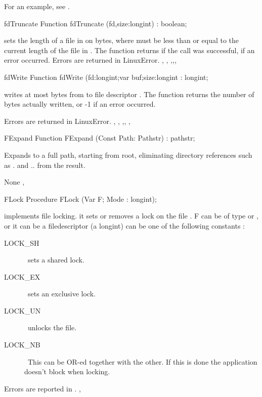 For an example, see .
\begin{function}{fdTruncate}
\Declaration
Function fdTruncate (fd,size:longint) : boolean;

\Description
{} sets the length of a file in  on 
bytes, where  must be less than or equal to the current length of
the file in .
The function returns  if the call was successful,  if
an error occurred.
\Errors
Errors are returned in LinuxError.
\SeeAlso
{}, , ,,,
\end{function}
\begin{function}{fdWrite}
\Declaration
Function fdWrite (fd:longint;var buf;size:longint : longint;

\Description
{} writes at most  bytes from  to
file descriptor .
The function returns the number of bytes actually written, or -1 if an error
occurred.

\Errors
Errors are returned in LinuxError.
\SeeAlso
{}, , ,,
, 
\end{function}
\begin{function}{FExpand}
\Declaration
Function FExpand (Const Path: Pathstr) : pathstr;

\Description
 Expands  to a full path, starting from root,
eliminating directory references such as . and .. from the result.

\Errors
None
\SeeAlso
{}, 
\end{function}
\html{}
\begin{procedure}{FLock}
\Declaration
Procedure FLock (Var F; Mode : longint);

\Description
{} implements file locking. it sets or removes a lock on the file
. F can be of type  or , or it can be a \linux
filedescriptor (a longint)
 can be one of the following constants :
\begin{description}
\item [LOCK\_SH] \ sets a shared lock.
\item [LOCK\_EX] \ sets an exclusive lock.
\item [LOCK\_UN] \ unlocks the file.
\item [LOCK\_NB] \ This can be OR-ed together with the other. If this is done
the application doesn't block when locking.
\end{description}

\Errors
Errors are reported in .
\SeeAlso
{}, 
\end{procedure}
